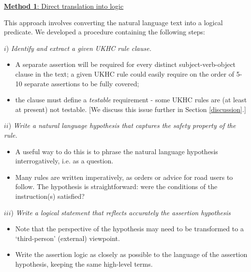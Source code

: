 \vspace{2mm}
\noindent\underline{\textbf{Method 1}: Direct translation into logic}
\label{direct_translation}

This approach involves converting the natural language text into a logical predicate. We developed a procedure containing the following steps: 

\noindent $i$) \emph{Identify and extract a given UKHC rule clause.} 
    \begin{itemize}
    	\item A separate assertion will be required for every distinct subject-verb-object clause in the text; a given UKHC rule could easily require on the order of 5-10 separate assertions to be fully covered;
    	\item the clause must define a \emph{testable} requirement - some UKHC rules are (at least at present) not testable. [We discuss this issue further in Section \ref{discussion}.]
    \end{itemize} 
    \noindent $ii$) \emph{Write a natural language hypothesis that captures the safety property of the rule.} 
    \begin{itemize}
    	\item A useful way to do this is to phrase the natural language hypothesis interrogatively, i.e. as a question.
    	\item Many rules are written imperatively, as orders or advice for road users to follow. The hypothesis is straightforward: were the conditions of the instruction(s) satisfied? %
    \end{itemize}
      
    \noindent $iii$)  \emph{Write a logical statement that reflects accurately the assertion hypothesis}
    \begin{itemize}
    	\item Note that the perspective of the hypothesis may need to be transformed to a `third-person' (external) viewpoint.
    	\item Write the assertion logic as closely as possible to the language of the assertion hypothesis, keeping the same high-level terms.%
    \end{itemize}
   

